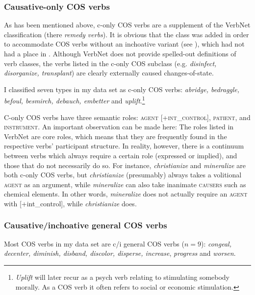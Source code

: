 \subsubsection{{Causative-only COS verbs}}\label{sec:cos-VN-conly}\largerpage

As has been mentioned above, c-only COS verbs are a supplement of the VerbNet classification (there \textit{remedy verbs}). It is obvious that the class was added in order to accommodate COS verbs without an inchoative variant (see ), which had not had a place in \citet{Levin.1993}. Although VerbNet does not provide spelled-out definitions of verb classes, the verbs listed in the c-only COS subclass (e.g. \textit{disinfect, disorganize, transplant}) are clearly externally caused changes-of-state.

I classified seven types in my data set as c-only COS verbs: \textit{abridge, bedraggle, befoul, besmirch, debauch, embetter} and \textit{uplift}.{\footnote{\textit{Uplift} will later recur as a psych verb relating to stimulating somebody morally. As a COS verb it often refers to social or economic stimulation.}}

C-only COS verbs have three semantic roles: \textsc{agent [+int\_control], patient}, and \textsc{instrument}.
An important observation can be made here: The roles listed in VerbNet are core roles, which means that they are frequently found in the respective verbs' participant structure. In reality, however, there is a continuum between verbs which always require a certain role (expressed or implied), and those that do not necessarily do so. For instance, \textit{christianize} and \textit{mineralize} are both c-only COS verbs, but \textit{christianize} (presumably) always takes a volitional \textsc{agent} as an argument, while \textit{mineralize} can also take inanimate \textsc{causers} such as chemical elements. In other words, \textit{mineralize} does not actually require an \textsc{agent} with [+int\_control], while \textit{christianize} does.

\subsubsection{Causative/inchoative general COS verbs}
\label{sec:cos-VN-c/igeneral}

Most COS verbs in my data set are c/i general COS verbs ($n=9$): \textit{congeal, decenter, diminish, disband, discolor, disperse, increase}, \textit{progress} and \textit{worsen}.

